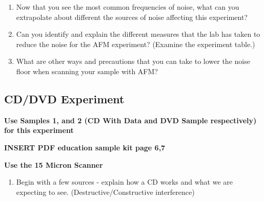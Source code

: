 \documentclass{../lab}
\begin{document}
{\begin{enumerate}
\begin{itemize}
        \item Perform a Fast Fourier Transform (FFT) to this line of data in the way of your choosing (Excel, Matlab, Python, by hand, etc.)

    \begin{itemize}
        \item You may wish to do steps 4-5 for multiple rows of data from a single scan, for this will confirm that the general trend of the FFT is similar

        \item If you do not know how to do this, you may refer to this \href{http://experimentationlab.berkeley.edu/sites/default/files/AFMImages/afm\_freq.m}{\textbf{sample Matlab script}}.

    \end{itemize}

        \item Plot your results, and save your plot to include in your lab write-up

    \end{itemize}

    \item Now that you see the most common frequencies of noise, what can you extrapolate about different the sources of noise affecting this experiment?

    \item Can you identify and explain the different measures that the lab has taken to reduce the noise for the AFM experiment? (Examine the experiment table.)

    \item What are other ways and precautions that you can take to lower the noise floor when scanning your sample with AFM?

\end{enumerate}

\subsection{CD/DVD Experiment}

\textbf{Use Samples 1, and 2 (CD With Data and DVD Sample respectively) for this experiment}

\textbf{​INSERT PDF education sample kit page 6,7}

\textbf{Use the 15 Micron Scanner }

\begin{enumerate}
    \item Begin with a few sources - explain how a CD works and what we are expecting to see. (Destructive/Constructive interference)


\end{enumerate}}
\end{document}
